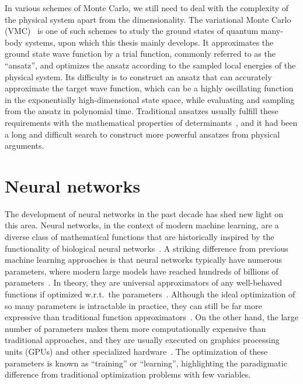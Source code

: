 In various schemes of Monte Carlo, we still need to deal with the complexity of the physical system apart from the dimensionality. The variational Monte Carlo (VMC)~\cite{scherer2017computational} is one of such schemes to study the ground states of quantum many-body systems, upon which this thesis mainly develops. It approximates the ground state wave function by a trial function, commonly referred to as the ``ansatz'', and optimizes the ansatz according to the sampled local energies of the physical system. Its difficulty is to construct an ansatz that can accurately approximate the target wave function, which can be a highly oscillating function in the exponentially high-dimensional state space, while evaluating and sampling from the ansatz in polynomial time. Traditional ansatzes usually fulfill these requirements with the mathematical properties of determinants~\cite{slater1929theory, bouchaud1988pair}, and it had been a long and difficult search to construct more powerful ansatzes from physical arguments.

\section{Neural networks}
\label{sec:intro-ml}

The development of neural networks in the past decade has shed new light on this area. Neural networks, in the context of modern machine learning, are a diverse class of mathematical functions that are historically inspired by the functionality of biological neural networks~\cite{hopfield1982neural, mackay2003information}. A striking difference from previous machine learning approaches is that neural networks typically have numerous parameters, where modern large models have reached hundreds of billions of parameters~\cite{brown2020language}. In theory, they are universal approximators of any well-behaved functions if optimized w.r.t.\ the parameters~\cite{hornik1989multilayer}. Although the ideal optimization of so many parameters is intractable in practice, they can still be far more expressive than traditional function approximators~\cite{sontag1998vc}. On the other hand, the large number of parameters makes them more computationally expensive than traditional approaches, and they are usually executed on graphics processing units (GPUs) and other specialized hardware~\cite{chen2020survey}. The optimization of these parameters is known as ``training'' or ``learning'', highlighting the paradigmatic difference from traditional optimization problems with few variables.

